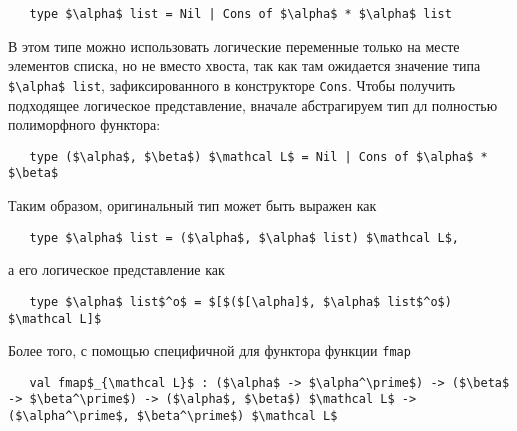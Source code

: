 
\begin{lstlisting}
   type $\alpha$ list = Nil | Cons of $\alpha$ * $\alpha$ list
\end{lstlisting}

В этом типе можно использовать логические переменные только на месте элементов списка, но не вместо хвоста, так как там ожидается значение типа \lstinline|$\alpha$ list|, зафиксированного в конструкторе  \lstinline|Cons|.
Чтобы получить подходящее логическое представление, вначале абстрагируем тип дл полностью полиморфного функтора:


\begin{lstlisting}
   type ($\alpha$, $\beta$) $\mathcal L$ = Nil | Cons of $\alpha$ * $\beta$
\end{lstlisting}

\noindent Таким образом, оригинальный тип может быть выражен как


\begin{lstlisting}
   type $\alpha$ list = ($\alpha$, $\alpha$ list) $\mathcal L$,
\end{lstlisting}

\noindent а его логическое представление как

\begin{lstlisting}
   type $\alpha$ list$^o$ = $[$($[\alpha]$, $\alpha$ list$^o$) $\mathcal L]$
\end{lstlisting}

Более того, с помощью специфичной для функтора функции \lstinline=fmap=

\begin{lstlisting}
   val fmap$_{\mathcal L}$ : ($\alpha$ -> $\alpha^\prime$) -> ($\beta$ -> $\beta^\prime$) -> ($\alpha$, $\beta$) $\mathcal L$ -> ($\alpha^\prime$, $\beta^\prime$) $\mathcal L$
\end{lstlisting}

